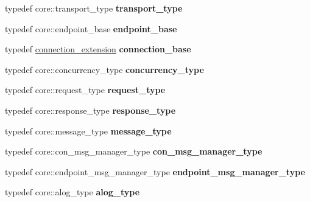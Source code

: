 \begin{DoxyCompactItemize}
typedef core\+::transport\+\_\+type {\bfseries transport\+\_\+type}
\item 
\mbox{\label{structstub__config_a9f66dcbba94c7b2d45f366bec76c596f}} 
typedef core\+::endpoint\+\_\+base {\bfseries endpoint\+\_\+base}
\item 
\mbox{\label{structstub__config_a3dc8556489744a239e858da91a224a5e}} 
typedef \mbox{\hyperlink{structconnection__extension}{connection\+\_\+extension}} {\bfseries connection\+\_\+base}
\item 
\mbox{\label{structstub__config_adfbabf7bc98d14349e3aaf93ce286679}} 
typedef core\+::concurrency\+\_\+type {\bfseries concurrency\+\_\+type}
\item 
\mbox{\label{structstub__config_adf25cb289c00f17e0edde3ee14c7d513}} 
typedef core\+::request\+\_\+type {\bfseries request\+\_\+type}
\item 
\mbox{\label{structstub__config_af5bf09e5641cb374d09ca1cc57a3db68}} 
typedef core\+::response\+\_\+type {\bfseries response\+\_\+type}
\item 
\mbox{\label{structstub__config_a608dd8f08c2967a1279f862646d5ccfe}} 
typedef core\+::message\+\_\+type {\bfseries message\+\_\+type}
\item 
\mbox{\label{structstub__config_ac54fff1ce93b9e96d7c55f7a5f7070b6}} 
typedef core\+::con\+\_\+msg\+\_\+manager\+\_\+type {\bfseries con\+\_\+msg\+\_\+manager\+\_\+type}
\item 
\mbox{\label{structstub__config_a41f4e1a5902c7a558e4f06b223bff9e3}} 
typedef core\+::endpoint\+\_\+msg\+\_\+manager\+\_\+type {\bfseries endpoint\+\_\+msg\+\_\+manager\+\_\+type}
\item 
\mbox{\label{structstub__config_a0d27080bdc8a484a1c742853bcc92673}} 
typedef core\+::alog\+\_\+type {\bfseries alog\+\_\+type}
\item 
\mbox{\label{structstub__config_a48001c3d916c6e12404be8ce13e7c06d}} 

\end{DoxyCompactItemize}
